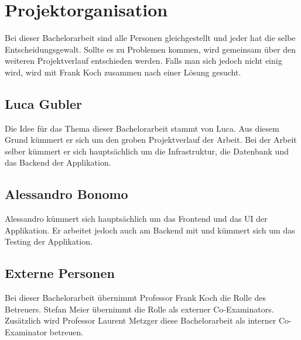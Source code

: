 \section{Projektorganisation}
Bei dieser Bachelorarbeit sind alle Personen gleichgestellt und jeder hat die selbe Entscheidungsgewalt. Sollte es zu Problemen kommen, wird gemeinsam über den weiteren Projektverlauf entschieden werden. Falls man sich jedoch nicht einig wird, wird mit Frank Koch zusammen nach einer Lösung gesucht.

\subsection*{Luca Gubler}
Die Idee für das Thema dieser Bachelorarbeit stammt von Luca. Aus diesem Grund kümmert er sich um den groben Projektverlauf der Arbeit. Bei der Arbeit selber kümmert er sich hauptsächlich um die Infrastruktur, die Datenbank und das Backend der Applikation.

\subsection*{Alessandro Bonomo}
Alessandro kümmert sich hauptsächlich um das Frontend und das UI der Applikation. Er arbeitet jedoch auch am Backend mit und kümmert sich um das Testing der Applikation.

\subsection*{Externe Personen}
Bei dieser Bachelorarbeit übernimmt Professor Frank Koch die Rolle des Betreuers. Stefan Meier übernimmt die Rolle als externer Co-Examinators. Zusätzlich wird Professor Laurent Metzger diese Bachelorarbeit als interner Co-Examinator betreuen.


\newpage